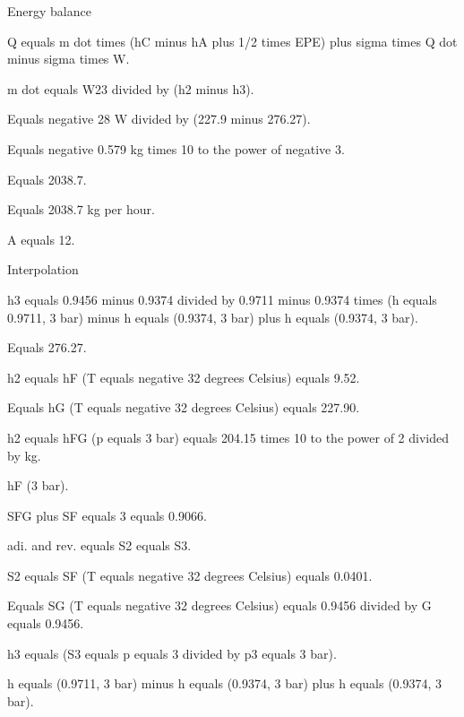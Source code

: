 Energy balance

Q equals m dot times (hC minus hA plus 1/2 times EPE) plus sigma times Q dot minus sigma times W.

m dot equals W23 divided by (h2 minus h3).

Equals negative 28 W divided by (227.9 minus 276.27).

Equals negative 0.579 kg times 10 to the power of negative 3.

Equals 2038.7.

Equals 2038.7 kg per hour.

A equals 12.

Interpolation

h3 equals 0.9456 minus 0.9374 divided by 0.9711 minus 0.9374 times (h equals 0.9711, 3 bar) minus h equals (0.9374, 3 bar) plus h equals (0.9374, 3 bar).

Equals 276.27.

h2 equals hF (T equals negative 32 degrees Celsius) equals 9.52.

Equals hG (T equals negative 32 degrees Celsius) equals 227.90.

h2 equals hFG (p equals 3 bar) equals 204.15 times 10 to the power of 2 divided by kg.

hF (3 bar).

SFG plus SF equals 3 equals 0.9066.

adi. and rev. equals S2 equals S3.

S2 equals SF (T equals negative 32 degrees Celsius) equals 0.0401.

Equals SG (T equals negative 32 degrees Celsius) equals 0.9456 divided by G equals 0.9456.

h3 equals (S3 equals p equals 3 divided by p3 equals 3 bar).

h equals (0.9711, 3 bar) minus h equals (0.9374, 3 bar) plus h equals (0.9374, 3 bar).